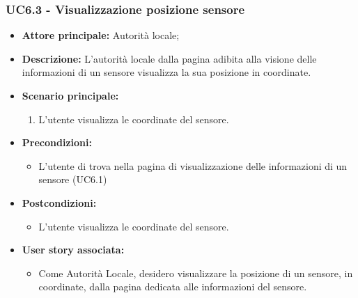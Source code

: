 \documentclass{article}
\begin{document}
\subsubsection{UC6.3 - Visualizzazione posizione sensore}
\begin{itemize}
    \item \textbf{Attore principale:} Autorità locale;
    \item \textbf{Descrizione:} L’autorità locale dalla pagina adibita alla visione delle informazioni di un sensore visualizza la sua posizione in coordinate.
    \item \textbf{Scenario principale:}
          \begin{enumerate}
              \item L'utente visualizza le coordinate del sensore.
          \end{enumerate}
    \item \textbf{Precondizioni:}
          \begin{itemize}
              \item  L'utente di trova nella pagina di visualizzazione delle informazioni di un sensore (UC6.1)
          \end{itemize}
    \item \textbf{Postcondizioni:}
          \begin{itemize}
              \item  L'utente visualizza le coordinate del sensore.
          \end{itemize}
    \item \textbf{User story associata:}
          \begin{itemize}
              \item Come Autorità Locale, desidero visualizzare la posizione di un sensore, in coordinate, dalla pagina dedicata alle informazioni del sensore.
          \end{itemize}
\end{itemize}
\end{document}
